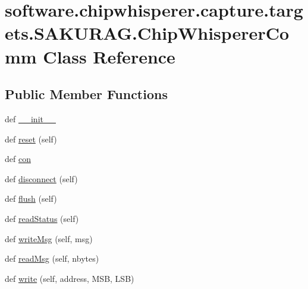 \hypertarget{classsoftware_1_1chipwhisperer_1_1capture_1_1targets_1_1SAKURAG_1_1ChipWhispererComm}{}\section{software.\+chipwhisperer.\+capture.\+targets.\+S\+A\+K\+U\+R\+A\+G.\+Chip\+Whisperer\+Comm Class Reference}
\label{classsoftware_1_1chipwhisperer_1_1capture_1_1targets_1_1SAKURAG_1_1ChipWhispererComm}
\subsection*{Public Member Functions}
\begin{DoxyCompactItemize}
\item 
def \hyperlink{classsoftware_1_1chipwhisperer_1_1capture_1_1targets_1_1SAKURAG_1_1ChipWhispererComm_a2ac1db61d004b629819751f61c8ad493}{\+\_\+\+\_\+init\+\_\+\+\_\+}
\item 
def \hyperlink{classsoftware_1_1chipwhisperer_1_1capture_1_1targets_1_1SAKURAG_1_1ChipWhispererComm_a0ad84d5dca53c99bec10292a1ca3ff46}{reset} (self)
\item 
def \hyperlink{classsoftware_1_1chipwhisperer_1_1capture_1_1targets_1_1SAKURAG_1_1ChipWhispererComm_adce7a88374360a598223aac43faa4d25}{con}
\item 
def \hyperlink{classsoftware_1_1chipwhisperer_1_1capture_1_1targets_1_1SAKURAG_1_1ChipWhispererComm_a85cd276bfd59c530eaeffc852d223a7b}{disconnect} (self)
\item 
def \hyperlink{classsoftware_1_1chipwhisperer_1_1capture_1_1targets_1_1SAKURAG_1_1ChipWhispererComm_a7d0dfb167255f9298cbc3f4e9e1ea2f0}{flush} (self)
\item 
def \hyperlink{classsoftware_1_1chipwhisperer_1_1capture_1_1targets_1_1SAKURAG_1_1ChipWhispererComm_a4bd764c98c163e7f0e62a3bc6e2d0d40}{read\+Status} (self)
\item 
def \hyperlink{classsoftware_1_1chipwhisperer_1_1capture_1_1targets_1_1SAKURAG_1_1ChipWhispererComm_ab1bfde1b19eefaefd3f18ee4178c982c}{write\+Msg} (self, msg)
\item 
def \hyperlink{classsoftware_1_1chipwhisperer_1_1capture_1_1targets_1_1SAKURAG_1_1ChipWhispererComm_a8bbb21f0e60f4f8787041ad65b9029e9}{read\+Msg} (self, nbytes)
\item 
def \hyperlink{classsoftware_1_1chipwhisperer_1_1capture_1_1targets_1_1SAKURAG_1_1ChipWhispererComm_a77f2dca36fb710c9a3ee67b6f797d88a}{write} (self, address, M\+S\+B, L\+S\+B)

\end{DoxyCompactItemize}
